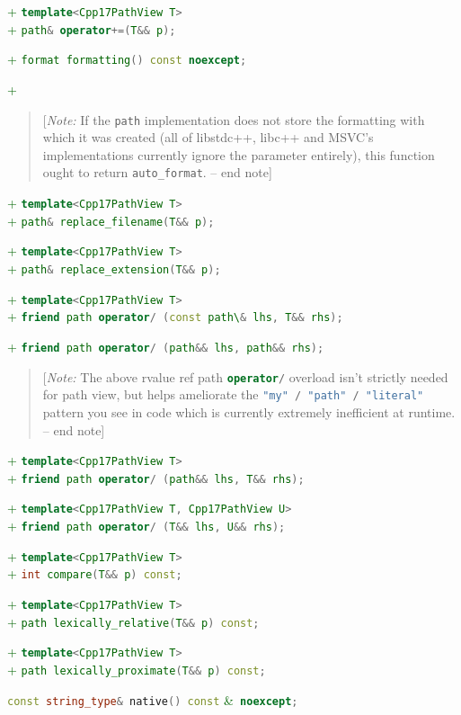 \documentclass[11pt]{article}
\newcommand{\code}[2][cpp]{\lstinline[language=#1,basicstyle=\small\ttfamily]{#2}}
\newcommand{\note}[1]{\begin{quote}[\textit{Note:} #1 -- end note]\end{quote}}
\newcommand{\tsreplace}[3]{\textcolor{red}{\sout{#1}}#2\textcolor{darkgreen}{#3}}
\begin{document}
\tsreplace{}{}{+ \code{template<Cpp17PathView T>}}\\
\tsreplace{}{}{+ \code{path& operator+=(T&& p);}}

\tsreplace{}{}{+ \code{format formatting() const noexcept;}}

\tsreplace{}{}{+ \note{If the \code{path} implementation does not store the formatting with which it was created (all of libstdc++, libc++ and MSVC's implementations currently ignore the parameter entirely), this function ought to return \code{auto_format}.}}

\tsreplace{}{}{+ \code{template<Cpp17PathView T>}}\\
\tsreplace{}{}{+ \code{path& replace_filename(T&& p);}}

\tsreplace{}{}{+ \code{template<Cpp17PathView T>}}\\
\tsreplace{}{}{+ \code{path& replace_extension(T&& p);}}

\tsreplace{}{}{+ \code{template<Cpp17PathView T>}}\\
\tsreplace{}{}{+ \code{friend path operator/ (const path\& lhs, T&& rhs);}}

\tsreplace{}{}{+ \code{friend path operator/ (path&& lhs, path&& rhs);}}

\note{The above rvalue ref path \code{operator/} overload isn't strictly needed for path view, but helps ameliorate the \code{"my" / "path" / "literal"} pattern you see in code which is currently extremely inefficient at runtime.}

\tsreplace{}{}{+ \code{template<Cpp17PathView T>}}\\
\tsreplace{}{}{+ \code{friend path operator/ (path&& lhs, T&& rhs);}}

\tsreplace{}{}{+ \code{template<Cpp17PathView T, Cpp17PathView U>}}\\
\tsreplace{}{}{+ \code{friend path operator/ (T&& lhs, U&& rhs);}}

\tsreplace{}{}{+ \code{template<Cpp17PathView T>}}\\
\tsreplace{}{}{+ \code{int compare(T&& p) const;}}

\tsreplace{}{}{+ \code{template<Cpp17PathView T>}}\\
\tsreplace{}{}{+ \code{path lexically_relative(T&& p) const;}}

\tsreplace{}{}{+ \code{template<Cpp17PathView T>}}\\
\tsreplace{}{}{+ \code{path lexically_proximate(T&& p) const;}}

\code{const string_type& native() const} \tsreplace{}{}{\&}\code{ noexcept;}
\end{document}
